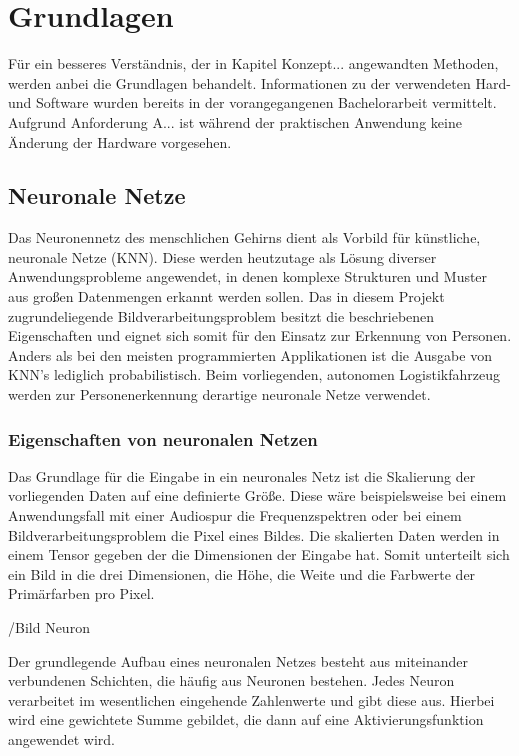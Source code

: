\chapter{Grundlagen}
\label{ch: Grundlagen}
	Für ein besseres Verständnis, der in Kapitel Konzept... angewandten Methoden, werden anbei die Grundlagen behandelt. Informationen zu der verwendeten Hard- und Software wurden bereits in der vorangegangenen Bachelorarbeit vermittelt. Aufgrund Anforderung A... ist während der praktischen Anwendung keine Änderung der Hardware vorgesehen.
 
	
 	\section{Neuronale Netze}
	\label{sec: ROS}
	
	Das Neuronennetz des menschlichen Gehirns dient als Vorbild für künstliche, neuronale Netze (KNN). Diese werden heutzutage als Lösung diverser Anwendungsprobleme angewendet, in denen komplexe Strukturen und Muster aus großen Datenmengen erkannt werden sollen. Das in diesem Projekt zugrundeliegende Bildverarbeitungsproblem besitzt die beschriebenen Eigenschaften und eignet sich somit für den Einsatz zur Erkennung von Personen. Anders als bei den meisten programmierten Applikationen ist die Ausgabe von KNN's lediglich probabilistisch. Beim vorliegenden, autonomen Logistikfahrzeug werden zur Personenerkennung derartige neuronale Netze verwendet.
	
		\subsection{Eigenschaften von neuronalen Netzen}
		
		Das Grundlage für die Eingabe in ein neuronales Netz ist die Skalierung der vorliegenden Daten auf eine definierte Größe. Diese wäre beispielsweise bei einem Anwendungsfall mit einer Audiospur die Frequenzspektren oder bei einem Bildverarbeitungsproblem die Pixel eines Bildes. Die skalierten Daten werden in einem Tensor gegeben der die Dimensionen der Eingabe hat. Somit unterteilt sich ein Bild in die drei Dimensionen, die Höhe, die Weite und die Farbwerte der Primärfarben pro Pixel.  
		
		/Bild Neuron
		
		Der grundlegende Aufbau eines neuronalen Netzes besteht aus miteinander verbundenen Schichten, die häufig aus Neuronen bestehen. Jedes Neuron verarbeitet im wesentlichen eingehende Zahlenwerte und gibt diese aus. Hierbei wird eine gewichtete Summe gebildet, die dann auf eine Aktivierungsfunktion angewendet wird.
		
